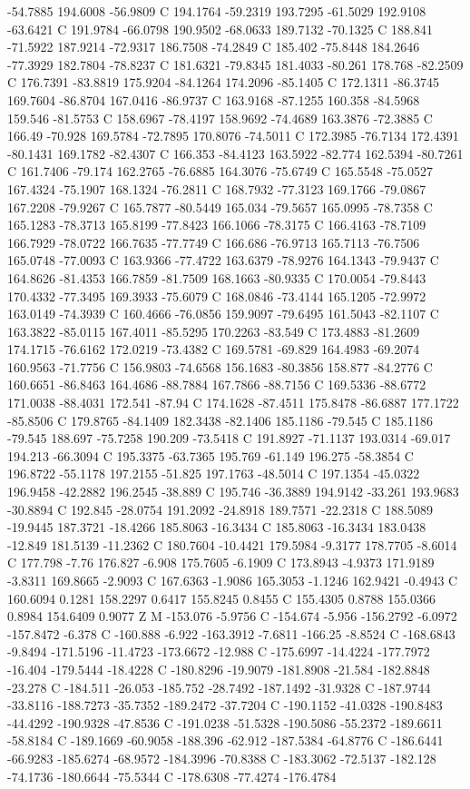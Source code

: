 {{{-54.7885 194.6008 -56.9809 C 194.1764 -59.2319 193.7295 -61.5029 192.9108 -63.6421 C 191.9784 -66.0798 190.9502 -68.0633 189.7132 -70.1325 C 188.841 -71.5922 187.9214 -72.9317 186.7508 -74.2849 C 185.402 -75.8448 184.2646 -77.3929 182.7804 -78.8237 C 181.6321 -79.8345 181.4033 -80.261 178.768 -82.2509 C 176.7391 -83.8819 175.9204 -84.1264 174.2096 -85.1405 C 172.1311 -86.3745 169.7604 -86.8704 167.0416 -86.9737 C 163.9168 -87.1255 160.358 -84.5968 159.546 -81.5753 C 158.6967 -78.4197 158.9692 -74.4689 163.3876 -72.3885 C 166.49 -70.928 169.5784 -72.7895 170.8076 -74.5011 C 172.3985 -76.7134 172.4391 -80.1431 169.1782 -82.4307 C 166.353 -84.4123 163.5922 -82.774 162.5394 -80.7261 C 161.7406 -79.174 162.2765 -76.6885 164.3076 -75.6749 C 165.5548 -75.0527 167.4324 -75.1907 168.1324 -76.2811 C 168.7932 -77.3123 169.1766 -79.0867 167.2208 -79.9267 C 165.7877 -80.5449 165.034 -79.5657 165.0995 -78.7358 C 165.1283 -78.3713 165.8199 -77.8423 166.1066 -78.3175 C 166.4163 -78.7109 166.7929 -78.0722 166.7635 -77.7749 C 166.686 -76.9713 165.7113 -76.7506 165.0748 -77.0093 C 163.9366 -77.4722 163.6379 -78.9276 164.1343 -79.9437 C 164.8626 -81.4353 166.7859 -81.7509 168.1663 -80.9335 C 170.0054 -79.8443 170.4332 -77.3495 169.3933 -75.6079 C 168.0846 -73.4144 165.1205 -72.9972 163.0149 -74.3939 C 160.4666 -76.0856 159.9097 -79.6495 161.5043 -82.1107 C 163.3822 -85.0115 167.4011 -85.5295 170.2263 -83.549 C 173.4883 -81.2609 174.1715 -76.6162 172.0219 -73.4382 C 169.5781 -69.829 164.4983 -69.2074 160.9563 -71.7756 C 156.9803 -74.6568 156.1683 -80.3856 158.877 -84.2776 C 160.6651 -86.8463 164.4686 -88.7884 167.7866 -88.7156 C 169.5336 -88.6772 171.0038 -88.4031 172.541 -87.94 C 174.1628 -87.4511 175.8478 -86.6887 177.1722 -85.8506 C 179.8765 -84.1409 182.3438 -82.1406 185.1186 -79.545 C 185.1186 -79.545 188.697 -75.7258 190.209 -73.5418 C 191.8927 -71.1137 193.0314 -69.017 194.213 -66.3094 C 195.3375 -63.7365 195.769 -61.149 196.275 -58.3854 C 196.8722 -55.1178 197.2155 -51.825 197.1763 -48.5014 C 197.1354 -45.0322 196.9458 -42.2882 196.2545 -38.889 C 195.746 -36.3889 194.9142 -33.261 193.9683 -30.8894 C 192.845 -28.0754 191.2092 -24.8918 189.7571 -22.2318 C 188.5089 -19.9445 187.3721 -18.4266 185.8063 -16.3434 C 185.8063 -16.3434 183.0438 -12.849 181.5139 -11.2362 C 180.7604 -10.4421 179.5984 -9.3177 178.7705 -8.6014 C 177.798 -7.76 176.827 -6.908 175.7605 -6.1909 C 173.8943 -4.9373 171.9189 -3.8311 169.8665 -2.9093 C 167.6363 -1.9086 165.3053 -1.1246 162.9421 -0.4943 C 160.6094 0.1281 158.2297 0.6417 155.8245 0.8455 C 155.4305 0.8788 155.0366 0.8984 154.6409 0.9077 Z M -153.076 -5.9756 C -154.674 -5.956 -156.2792 -6.0972 -157.8472 -6.378 C -160.888 -6.922 -163.3912 -7.6811 -166.25 -8.8524 C -168.6843 -9.8494 -171.5196 -11.4723 -173.6672 -12.988 C -175.6997 -14.4224 -177.7972 -16.404 -179.5444 -18.4228 C -180.8296 -19.9079 -181.8908 -21.584 -182.8848 -23.278 C -184.511 -26.053 -185.752 -28.7492 -187.1492 -31.9328 C -187.9744 -33.8116 -188.7273 -35.7352 -189.2472 -37.7204 C -190.1152 -41.0328 -190.8483 -44.4292 -190.9328 -47.8536 C -191.0238 -51.5328 -190.5086 -55.2372 -189.6611 -58.8184 C -189.1669 -60.9058 -188.396 -62.912 -187.5384 -64.8776 C -186.6441 -66.9283 -185.6274 -68.9572 -184.3996 -70.8388 C -183.3062 -72.5137 -182.128 -74.1736 -180.6644 -75.5344 C -178.6308 -77.4274 -176.4784 }}}

